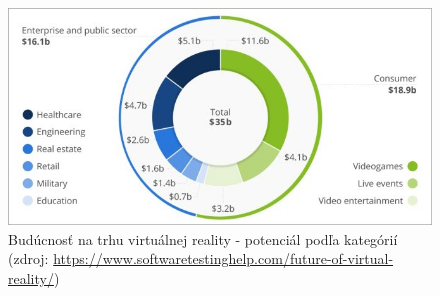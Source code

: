 \documentclass[10pt,slovak,a4paper]{article}
\begin{document}
\begin{figure}[tbhp]
    \centering
   \label{Image1}
    \includegraphics[scale=0.68]{images_article/Potential-of-VR-applications-by-category.jpg}
    \caption{Budúcnosť na trhu virtuálnej reality - potenciál podľa kategórií (zdroj: \url{https://www.softwaretestinghelp.com/future-of-virtual-reality/})}
    \clearpage
\end{figure}

\newpage


\end{document}
